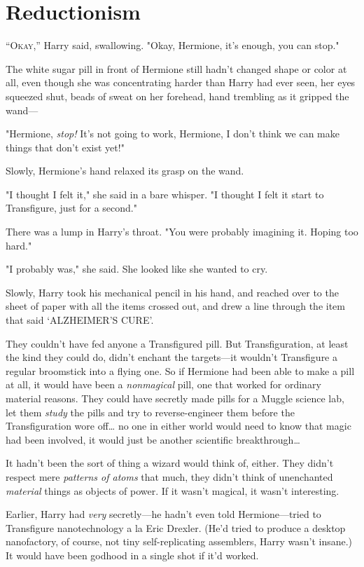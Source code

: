 \chapter{Reductionism}

\lettrine{“O}{kay},'' Harry said, swallowing. "Okay, Hermione, it's enough, you can stop."

The white sugar pill in front of Hermione still hadn't changed shape or color
at all, even though she was concentrating harder than Harry had ever seen, her
eyes squeezed shut, beads of sweat on her forehead, hand trembling as it
gripped the wand---

"Hermione, \emph{stop!} It's not going to work, Hermione, I don't think we can
make things that don't exist yet!"

Slowly, Hermione's hand relaxed its grasp on the wand.

"I thought I felt it," she said in a bare whisper. "I thought I felt it start
to Transfigure, just for a second."

There was a lump in Harry's throat. "You were probably imagining it. Hoping too
hard."

"I probably was," she said. She looked like she wanted to cry.

Slowly, Harry took his mechanical pencil in his hand, and reached over to the
sheet of paper with all the items crossed out, and drew a line through the item
that said `ALZHEIMER'S CURE'.

They couldn't have fed anyone a Transfigured pill. But Transfiguration, at
least the kind they could do, didn't enchant the targets---it wouldn't
Transfigure a regular broomstick into a flying one. So if Hermione had been
able to make a pill at all, it would have been a \emph{nonmagical} pill, one
that worked for ordinary material reasons. They could have secretly made pills
for a Muggle science lab, let them \emph{study} the pills and try to
reverse-engineer them before the Transfiguration wore off{\ldots} no one in
either world would need to know that magic had been involved, it would just be
another scientific breakthrough{\ldots}

It hadn't been the sort of thing a wizard would think of, either. They didn't
respect mere \emph{patterns of atoms} that much, they didn't think of
unenchanted \emph{material} things as objects of power. If it wasn't magical,
it wasn't interesting.

Earlier, Harry had \emph{very} secretly---he hadn't even told Hermione---tried
to Transfigure nanotechnology a la Eric Drexler. (He'd tried to produce a
desktop nanofactory, of course, not tiny self-replicating assemblers, Harry
wasn't insane.) It would have been godhood in a single shot if it'd worked.

